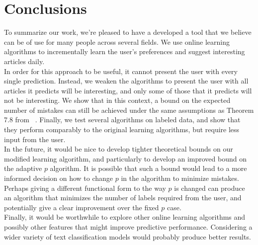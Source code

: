 \documentclass[12pt]{article}
\begin{document}
\section{Conclusions}
To summarize our work, we're pleased to have a developed a tool that we believe can be of use for many people across several fields. We use online learning algorithms to incrementally learn the user's preferences and suggest interesting articles daily.\\
In order for this approach to be useful, it cannot present the user with every single prediction.  Instead, we weaken the algorithms to present the user with all articles it predicts will be interesting, and only some of those that it predicts will not be interesting.  We show that in this context, a bound on the expected number of mistakes can still be achieved under the same assumptions as Theorem 7.8 from ~\cite{FML}.  Finally, we test several algorithms on labeled data, and show that they perform comparably to the original learning algorithms, but require less input from the user.  \\
In the future, it would be nice to develop tighter theoretical bounds on our modified learning algorithm, and particularly to develop an improved bound on the adaptive $p$ algorithm.  It is possible that such a bound would lead to a more informed decision on how to change $p$ in the algorithm to minimize mistakes. Perhaps giving a different functional form to the way $p$ is changed can produce an algorithm that minimizes the number of labels required from the user, and potentially give a clear improvement over the fixed $p$ case.\\
Finally, it would be worthwhile to explore other online learning algorithms and possibly other features that might improve predictive performance. Considering a wider variety of text classification models would probably produce better results.
{}

\end{document}
